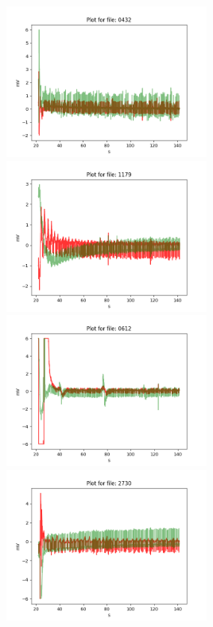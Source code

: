 \begin{figure}[ht!]
\begin{minipage}{.5\textwidth}
            \label{fig:sinus_4}
    \end{minipage}%
    \begin{minipage}{.5\textwidth}
      \centering
        \includegraphics[width=1.0\linewidth, height=5cm]{BachelorMasterThesis/DataExploration/Figures/atrial_fibrillation/ecg/0432.png}
            \label{fig:af_1}
        \includegraphics[width=1.0\linewidth, height=5cm]{BachelorMasterThesis/DataExploration/Figures/atrial_fibrillation/ecg/1179.png}
            \label{fig:af_2}
        \includegraphics[width=1.0\linewidth, height=5cm]{BachelorMasterThesis/DataExploration/Figures/atrial_fibrillation/ecg/0612.png}
            \label{fig:af_3}
        \includegraphics[width=1.0\linewidth, height=5cm]{BachelorMasterThesis/DataExploration/Figures/atrial_fibrillation/ecg/2730.png}

\end{minipage}
\end{figure}
